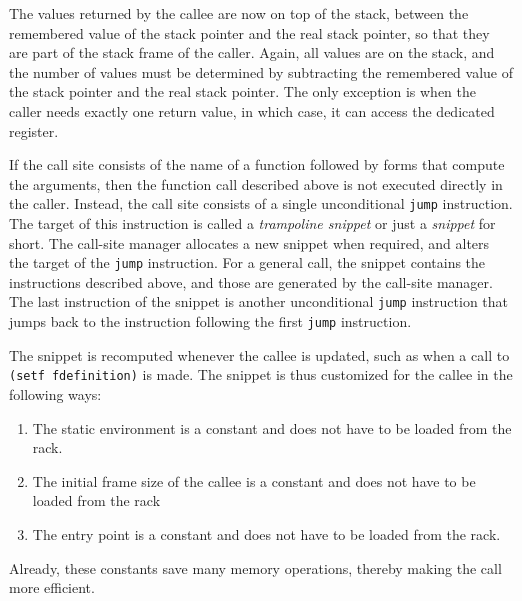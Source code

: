 The values returned by the callee are now on top of the stack, between
the remembered value of the stack pointer and the real stack pointer,
so that they are part of the stack frame of the caller.  Again, all
values are on the stack, and the number of values must be determined
by subtracting the remembered value of the stack pointer and the real
stack pointer.  The only exception is when the caller needs exactly
one return value, in which case, it can access the dedicated register.

If the call site consists of the name of a function followed by forms
that compute the arguments, then the function call described above is
not executed directly in the caller.  Instead, the call site consists
of a single unconditional \texttt{jump} instruction.  The target of
this instruction is called a \emph{trampoline snippet} or just a
\emph{snippet} for short.  The call-site manager allocates a new
snippet when required, and alters the target of the \texttt{jump}
instruction.  For a general call, the snippet contains the
instructions described above, and those are generated by the call-site
manager.  The last instruction of the snippet is another unconditional
\texttt{jump} instruction that jumps back to the instruction following
the first \texttt{jump} instruction.

The snippet is recomputed whenever the callee is updated, such as when
a call to \texttt{(setf fdefinition)} is made.  The snippet is thus
customized for the callee in the following ways:

\begin{enumerate}
\item The static environment is a constant and does not have to be
  loaded from the rack.
\item The initial frame size of the callee is a constant and does not
  have to be loaded from the rack
\item The entry point is a constant and does not have to be loaded
  from the rack.
\end{enumerate}

Already, these constants save many memory operations, thereby making
the call more efficient.

